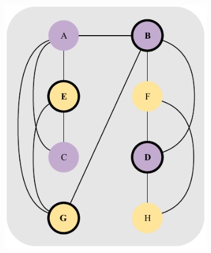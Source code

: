 \documentclass[a4paper, 10pt]{article}
\begin{document}
\begin{figure}[H]
\begin{subfigure}{0.19\textwidth}
    \end{subfigure}
    \hfill
    \begin{subfigure}{0.19\textwidth}
        \centering
        \includegraphics[width=1\linewidth]{5_13.pdf}
    \end{subfigure}
    \hfill
    \begin{subfigure}{0.19\textwidth}
        \centering

\end{subfigure}
\end{figure}
\end{document}
